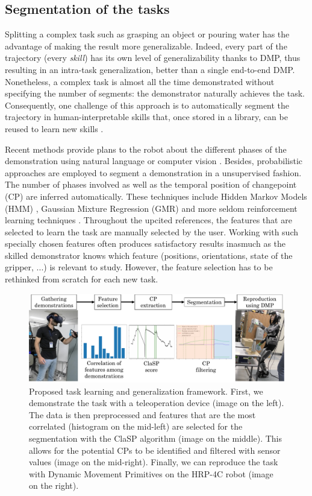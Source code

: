 \documentclass[a4paper, 10pt, conference]{ieeeconf}
\begin{document}
\subsection{Segmentation of the tasks} \label{Approach}

Splitting a complex task such as grasping an object or pouring water has the advantage of making the result more generalizable. Indeed, every part of the trajectory (every \textit{skill}) has its own level of generalizability thanks to DMP, thus resulting in an intra-task generalization, better than a single end-to-end DMP. Nonetheless, a complex task is almost all the time demonstrated without specifying the number of segments: the demonstrator naturally achieves the task. Consequently, one challenge of this approach is to automatically segment the trajectory in human-interpretable skills that, once stored in a library, can be reused to learn new skills \cite{meier_movement_2011}.

Recent methods provide plans to the robot about the different phases of the demonstration using natural language or computer vision \cite{caccavale_kinesthetic_2019} \cite{saran_enhancing_2019}. Besides, probabilistic approaches are employed to segment a demonstration in a unsupervised fashion. The number of phases involved as well as the temporal position of changepoint (CP) are inferred automatically. These techniques include Hidden Markov Models (HMM) \cite{niekum_learning_2015}, Gaussian Mixture Regression (GMR) \cite{calinon_learning_2010} \cite{calinon_learning_2007} and more seldom reinforcement learning techniques \cite{kroemer_towards_2015}. Throughout the upcited references, the features that are selected to learn the task are manually selected by the user. Working with such specially chosen features often produces satisfactory results inasmuch as the skilled demonstrator knows which feature (positions, orientations, state of the gripper, ...) is relevant to study. However, the feature selection has to be rethinked from scratch for each new task. \newline

\begin{figure}[t]
  \centering
  \includegraphics[width=0.85\linewidth]{img/framework.pdf}
  \caption{Proposed task learning and generalization framework. First, we demonstrate the task with a teleoperation device (image on the left). The data is then preprocessed and features that are the most correlated (histogram on the mid-left) are selected for the segmentation with the ClaSP algorithm (image on the middle). This allows for the potential CPs to be identified and filtered with sensor values (image on the mid-right). Finally, we can reproduce the task with Dynamic Movement Primitives on the HRP-4C robot (image on the right).}
  \label{fig:framework}
\end{figure}
\end{document}

